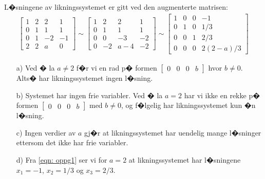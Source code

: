 \documentclass[a4paper, norsk, 12pt]{extarticle}
\begin{document}
\section{}
L�sningene av likningssystemet er gitt ved den augmenterte matrisen:
\begin{align} \label{eqn: oppg1}
		\begin{bmatrix}  1 & 2 & 2 & 1 \\  0 & 1 & 1 & 1 \\ 0 & 1 & -2 & -1 \\ 2 & 2 & a & 0  \end{bmatrix}
	\sim  \begin{bmatrix}  1 & 2 & 2 & 1 \\  0 & 1 & 1 & 1 \\ 0 & 0 & -3 & -2 \\ 0 & -2 & a-4 & -2  \end{bmatrix}
	\sim  \begin{bmatrix}  1 & 0 & 0 & -1 \\  0 & 1 & 0 & 1/3 \\ 0 & 0 & 1 & 2/3 \\ 0 & 0 & 0 & 2(2-a)/3  \end{bmatrix}
\end{align}

\begin{itemize}

\item[a)]
Ved � la $a \neq 2$ f�r vi en rad p� formen $ \begin{bmatrix} 0 & 0 & 0 & b \end{bmatrix}$ hvor $ b \neq 0 $.
Alts� har likningssystemet ingen l�sning.

\item[b)]
Systemet har ingen frie variabler.
Ved � la $a = 2$ har vi ikke en rekke p� formen $ \begin{bmatrix} 0 & 0 & 0 & b \end{bmatrix} $ med $b \neq 0$, og f�lgelig har likningssystemet kun �n l�sning.

\item[c)]
Ingen verdier av $a$ gj�r at likningssystemet har uendelig mange l�sninger ettersom det ikke har frie variabler.

\item[d)]
Fra \eqref{eqn: oppg1} ser vi for $a=2$ at likningssystemet har l�sningene $x_1 = -1$, $x_2 = 1/3$ og $x_3 = 2/3$.

\end{itemize}
\end{document}
